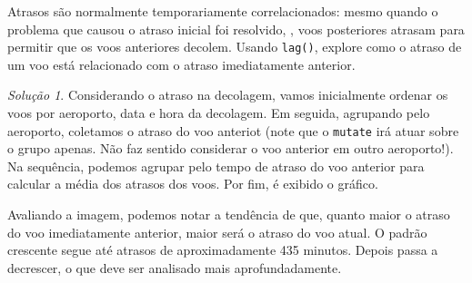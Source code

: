 \documentclass[
]{latex/krantz}
\theoremstyle{definition}
\theoremstyle{definition}
\theoremstyle{definition}
\theoremstyle{definition}
\theoremstyle{remark}
\newtheorem*{solution}{Solução}
\begin{document}
Atrasos são normalmente temporariamente correlacionados: mesmo quando o problema que causou o atraso inicial foi resolvido, , voos posteriores atrasam para permitir que os voos anteriores decolem. Usando \texttt{lag()}, explore como o atraso de um voo está relacionado com o atraso imediatamente anterior.

\begin{solution}
Considerando o atraso na decolagem, vamos inicialmente ordenar os voos por aeroporto, data e hora da decolagem. Em seguida, agrupando pelo aeroporto, coletamos o atraso do voo anteriot (note que o \texttt{mutate} irá atuar sobre o grupo apenas. Não faz sentido considerar o voo anterior em outro aeroporto!). Na sequência, podemos agrupar pelo tempo de atraso do voo anterior para calcular a média dos atrasos dos voos. Por fim, é exibido o gráfico.

Avaliando a imagem, podemos notar a tendência de que, quanto maior o atraso do voo imediatamente anterior, maior será o atraso do voo atual. O padrão crescente segue até atrasos de aproximadamente 435 minutos. Depois passa a decrescer, o que deve ser analisado mais aprofundadamente.


\end{solution}
\end{document}
